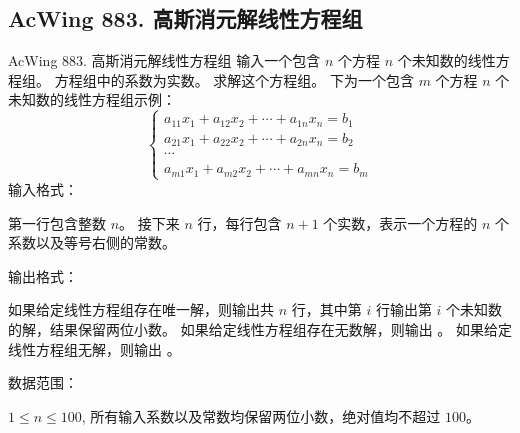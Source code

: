 \subsection{AcWing 883. 高斯消元解线性方程组}
\begin{titledbox}{AcWing 883. 高斯消元解线性方程组}
    输入一个包含 $n$ 个方程 $n$ 个未知数的线性方程组。 方程组中的系数为实数。 求解这个方程组。 下为一个包含 $m$ 个方程 $n$ 个未知数的线性方程组示例：
    \begin{equation*}
        \left\{
        \begin{array}{c}
            a_{11}x_1+a_{12}x_2+\cdots+a_{1n}x_n=b_1 \\
            a_{21}x_1+a_{22}x_2+\cdots+a_{2n}x_n=b_2 \\
            \cdots                                   \\
            a_{m1}x_1+a_{m2}x_2+\cdots+a_{mn}x_n=b_m
        \end{array}
        \right.
    \end{equation*}
    输入格式：

    第一行包含整数 $n$。 接下来 $n$ 行，每行包含 $n+1$ 个实数，表示一个方程的 $n$ 个系数以及等号右侧的常数。

    输出格式：

    如果给定线性方程组存在唯一解，则输出共 $n$ 行，其中第 $i$ 行输出第 $i$ 个未知数的解，结果保留两位小数。 如果给定线性方程组存在无数解，则输出 。 如果给定线性方程组无解，则输出 。

    数据范围：

    $1 \le n \le 100$, 所有输入系数以及常数均保留两位小数，绝对值均不超过 $100$。

    \begin{inputblock}
         \\
         \\
         \\
    \end{inputblock}
    \begin{outputblock}
         \\
         \\
    \end{outputblock}
\end{titledbox}

